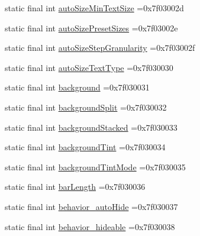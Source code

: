 \begin{DoxyCompactItemize}
\item 
static final int \mbox{\hyperlink{classbr_1_1unb_1_1cic_1_1mp_1_1marketmaster_1_1test_1_1R_1_1attr_ad16187e50947731c5babce8d2f1d77a3}{auto\+Size\+Min\+Text\+Size}} =0x7f03002d
\item 
static final int \mbox{\hyperlink{classbr_1_1unb_1_1cic_1_1mp_1_1marketmaster_1_1test_1_1R_1_1attr_aa6f7587210e3769903431978394a1762}{auto\+Size\+Preset\+Sizes}} =0x7f03002e
\item 
static final int \mbox{\hyperlink{classbr_1_1unb_1_1cic_1_1mp_1_1marketmaster_1_1test_1_1R_1_1attr_a13133359d1e2f238e673011ebb913f20}{auto\+Size\+Step\+Granularity}} =0x7f03002f
\item 
static final int \mbox{\hyperlink{classbr_1_1unb_1_1cic_1_1mp_1_1marketmaster_1_1test_1_1R_1_1attr_ac689413d8cd0c274f9d777d987d85251}{auto\+Size\+Text\+Type}} =0x7f030030
\item 
static final int \mbox{\hyperlink{classbr_1_1unb_1_1cic_1_1mp_1_1marketmaster_1_1test_1_1R_1_1attr_a4bbc4b77f4146ddd656b0ea47827dc6c}{background}} =0x7f030031
\item 
static final int \mbox{\hyperlink{classbr_1_1unb_1_1cic_1_1mp_1_1marketmaster_1_1test_1_1R_1_1attr_af9948b93a5aacc58a0c280545ac3428e}{background\+Split}} =0x7f030032
\item 
static final int \mbox{\hyperlink{classbr_1_1unb_1_1cic_1_1mp_1_1marketmaster_1_1test_1_1R_1_1attr_ad4db6dd8db117263dd8e5d96f2a3f5a7}{background\+Stacked}} =0x7f030033
\item 
static final int \mbox{\hyperlink{classbr_1_1unb_1_1cic_1_1mp_1_1marketmaster_1_1test_1_1R_1_1attr_ac5590e8318f8ef11000df9a4f089211f}{background\+Tint}} =0x7f030034
\item 
static final int \mbox{\hyperlink{classbr_1_1unb_1_1cic_1_1mp_1_1marketmaster_1_1test_1_1R_1_1attr_a41216ceecbcd1cead6dbc45cc4f40240}{background\+Tint\+Mode}} =0x7f030035
\item 
static final int \mbox{\hyperlink{classbr_1_1unb_1_1cic_1_1mp_1_1marketmaster_1_1test_1_1R_1_1attr_a88abde88ded30262ad227af1a47be036}{bar\+Length}} =0x7f030036
\item 
static final int \mbox{\hyperlink{classbr_1_1unb_1_1cic_1_1mp_1_1marketmaster_1_1test_1_1R_1_1attr_a08d897aa8285d2caf296c6a78ae0c6ef}{behavior\+\_\+auto\+Hide}} =0x7f030037
\item 
static final int \mbox{\hyperlink{classbr_1_1unb_1_1cic_1_1mp_1_1marketmaster_1_1test_1_1R_1_1attr_a162fe339bed3f8ee9489d584fd0fcd94}{behavior\+\_\+hideable}} =0x7f030038
\item 

\end{DoxyCompactItemize}
